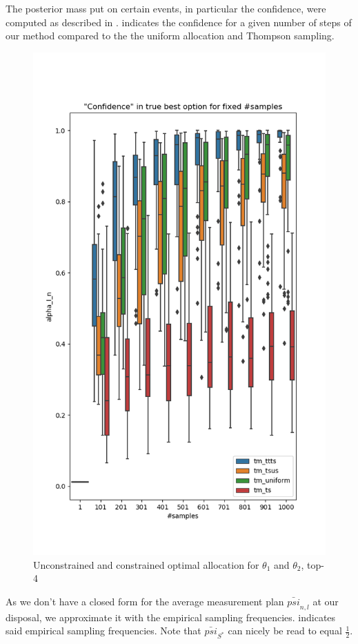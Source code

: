 The posterior mass put on certain events, in particular the confidence, were
computed as described in . 
indicates the confidence for a given number of steps of our method compared to
the the uniform allocation and Thompson sampling.
\begin{figure}[h]
  \centering
  \includegraphics[width=.5\textwidth]{190723-confidences.png}
  \caption{Unconstrained and constrained optimal allocation for $\theta_1$ and $\theta_2$, top-4}
  \label{fig:confidences}
\end{figure}
As we don't have a closed form for the average measurement plan
$\bar{psi}_{n,l}$ at our disposal, we approximate it with the empirical sampling
frequencies.  indicates said empirical sampling
frequencies. Note that $\bar{psi}_{S^*}$ can nicely be read to equal
$\frac{1}{2}$.
